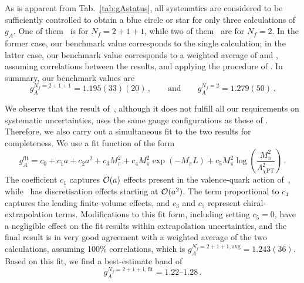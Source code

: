 
As is apparent from Tab.~\ref{tab:gAstatus}, all systematics are considered to be 
sufficiently controlled to obtain a blue circle or star for only three calculations of $g_A$.
%
One of them~\cite{Bhattacharya:2016zcn} is for $N_f=2+1+1$, while two of 
them~\cite{Capitani:2017qpc,Bali:2014nma} are for $N_f=2$.
%
In the former case, our benchmark value corresponds to the single calculation;
in the latter case, our benchmark value corresponds to a weighted average 
of \cite{Capitani:2017qpc} and \cite{Bali:2014nma}, assuming correlations
between the results, and applying the procedure of \cite{Schmelling:1994pz}.
%
In summary, our benchmark values are
\begin{equation}\label{eq:gAcriteria}
g_A^{N_f=2+1+1} = 1.195(33)(20)
\,,\qquad \mathrm{and}\qquad 
g_A^{N_f=2} = 1.279(50)\,.
\end{equation}

We observe that the result of~\cite{Berkowitz:2017gql}, although it does
not fulfill all our requirements on systematic uncertainties, uses the same 
gauge configurations as those of \cite{Bhattacharya:2016zcn}.
%
Therefore, we also carry out a simultaneous fit to the two results for
completeness.
%
We use a fit function of the form
\begin{equation}
g_A^{\mathrm{fit}} 
= 
c_0 + 
c_1a + 
c_2a^2 + 
c_3M_\pi^2 + 
c_4M_\pi^2 \exp(-M_\pi L) +
c_5M_\pi^2 \log\left(\frac{M_\pi^2}{\Lambda_{\chi \mathrm{PT}}^2}\right)\,.
\end{equation}
%
The coefficient $c_1$ captures ${\cal O}(a)$ effects present in the
valence-quark action of~\cite{Bhattacharya:2016zcn}, while~\cite{Berkowitz:2017gql} 
has discretisation effects starting at ${\cal O}(a^2)$. 
%
The term proportional to $c_4$ captures the leading finite-volume effects, and 
$c_3$ and $c_5$ represent chiral-extrapolation terms. 
%
Modifications to this fit form, including setting $c_5=0$, have a negligible 
effect on the fit results within extrapolation uncertainties, and the final 
result is in very good agreement with a weighted average of the two 
calculations, assuming 100\% correlations, which is 
$g_A^{N_f=2+1+1,\mathrm{avg}} = 1.243(36)$. 
%
Based on this fit, we find a best-estimate band of
\begin{equation}\label{eq:gAfit}
g_A^{N_f=2+1+1,\mathrm{fit}} = \numrange{1.22}{1.28}\,.
\end{equation}

